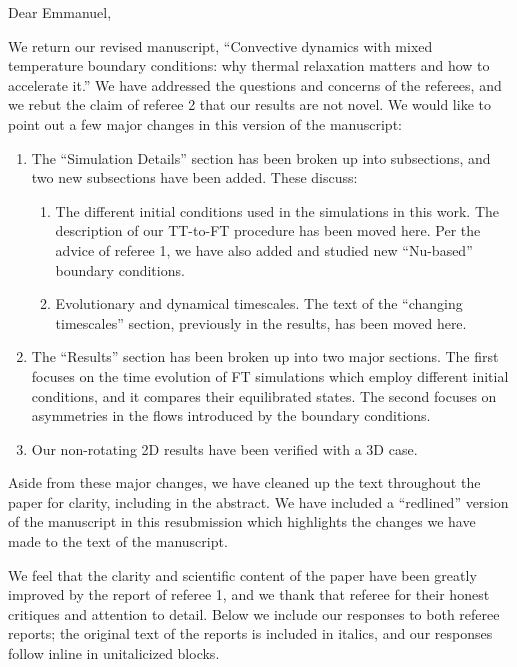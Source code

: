 \documentclass[aps, 11pt, singlecolumn]{revtex4-1} %
\begin{document}
\newenvironment{myquotation}{
\begin{quotation}
\itshape
}{ 
\end{quotation}
}
\noindent
Dear Emmanuel,
$\,$\newline

\begin{singlespace}
We return our revised manuscript, ``Convective dynamics with mixed temperature boundary conditions: why thermal relaxation matters and how to accelerate it.'' 
We have addressed the questions and concerns of the referees, and we rebut the claim of referee 2 that our results are not novel.
We would like to point out a few major changes in this version of the manuscript:
\begin{enumerate}
\item The ``Simulation Details'' section has been broken up into subsections, and two new subsections have been added. These discuss:
\begin{enumerate}
\item The different initial conditions used in the simulations in this work.
The description of our TT-to-FT procedure has been moved here.
Per the advice of referee 1, we have also added and studied new ``Nu-based'' boundary conditions.
\item Evolutionary and dynamical timescales.
The text of the ``changing timescales'' section, previously in the results, has been moved here.
\end{enumerate}
\item The ``Results'' section has been broken up into two major sections.
The first focuses on the time evolution of FT simulations which employ different initial conditions, and it compares their equilibrated states.
The second focuses on asymmetries in the flows introduced by the boundary conditions.
\item Our non-rotating 2D results have been verified with a 3D case.
\end{enumerate}
Aside from these major changes, we have cleaned up the text throughout the paper for clarity, including in the abstract.
We have included a ``redlined'' version of the manuscript in this resubmission which highlights the changes we have made to the text of the manuscript.

We feel that the clarity and scientific content of the paper have been greatly improved by the report of referee 1, and we thank that referee for their honest critiques and attention to detail. 
Below we include our responses to both referee reports; the original text of the reports is included in italics, and our responses follow inline in unitalicized blocks.


\end{singlespace}
\end{document}
